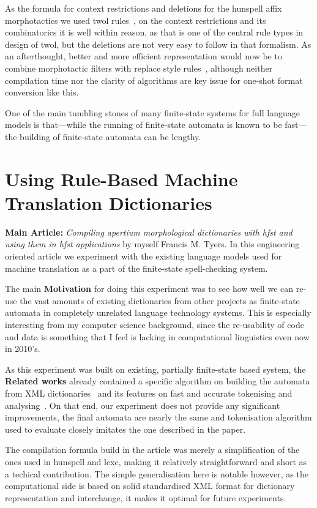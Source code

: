 \documentclass[officiallayout]{unihelcompling}
\begin{document}
As the formula for context restrictions and deletions for the hunspell affix
morphotactics we used twol rules~\citep{karttunen1992two}, on the context
restrictions and its combinatorics it is well within reason, as that is one of
the central rule types in design of twol, but the deletions are not very easy
to follow in that formalism. As an afterthought, better and more efficient
representation would now be to combine morphotactic filters with replace style
rules~\citep{karttunen1995replace}, although neither compilation time nor the
clarity of algorithms are key issue for one-shot format conversion like this.

One of the main tumbling stones of many finite-state systems for full language
models is that---while the running of finite-state automata is known to be
fast---the building of finite-state automata can be lengthy. 


\section{Using Rule-Based Machine Translation Dictionaries}
\label{sec:apertium}

\textbf{Main Article:} \emph{Compiling apertium morphological dictionaries with
hfst and using them in hfst applications} by myself Francis M. Tyers. In this
engineering oriented article we experiment with the existing language models
used for machine translation as a part of the finite-state spell-checking
system.

The main \textbf{Motivation} for doing this experiment was to see how well we
can re-use the vast amounts of existing dictionaries from other projects as
finite-state automata in completely unrelated language technology systems.
This is especially interesting from my computer science background, since
the re-usability of code and data is something that I feel is lacking in
computational linguistics even now in 2010's.

As this experiment was built on existing, partially finite-state based system,
the \textbf{Related works} already contained a specific algorithm on building
the automata from XML dictionaries~\citep{rojas2005construccion} and its
features on fast and accurate tokenising and analysing~\citep{}. On that end,
our experiment does not provide any significant improvements, the final
automata are nearly the same and tokenisation algorithm used to evaluate
closely imitates the one described in the paper.

The compilation formula build in the article was merely a simplification of
the ones used in hunspell and lexc, making it relatively straightforward and
short as a techical contribution. The simple generalisation here is notable
however, as the computational side is based on solid standardised XML
format for dictionary representation and interchange, it makes it optimal
for future experiments.
\end{document}
